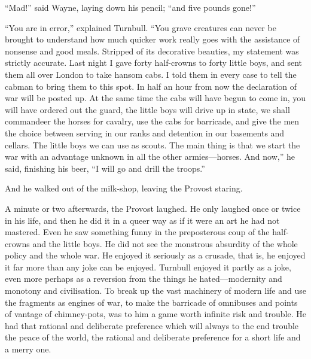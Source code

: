 \documentclass{book}
\begin{document}
“Mad!” said Wayne, laying down his pencil; “and five pounds gone!”

“You are in error,” explained Turnbull. “You grave creatures can never be brought to understand how much quicker work really goes with the assistance of nonsense and good meals. Stripped of its decorative beauties, my statement was strictly accurate. Last night I gave forty half-crowns to forty little boys, and sent them all over London to take hansom cabs. I told them in every case to tell the cabman to bring them to this spot. In half an hour from now the declaration of war will be posted up. At the same time the cabs will have begun to come in, you will have ordered out the guard, the little boys will drive up in state, we shall commandeer the horses for cavalry, use the cabs for barricade, and give the men the choice between serving in our ranks and detention in our basements and cellars. The little boys we can use as scouts. The main thing is that we start the war with an advantage unknown in all the other armies—horses. And now,” he said, finishing his beer, “I will go and drill the troops.”

And he walked out of the milk-shop, leaving the Provost staring.

A minute or two afterwards, the Provost laughed. He only laughed once or twice in his life, and then he did it in a queer way as if it were an art he had not mastered. Even he saw something funny in the preposterous coup of the half-crowns and the little boys. He did not see the monstrous absurdity of the whole policy and the whole war. He enjoyed it seriously as a crusade, that is, he enjoyed it far more than any joke can be enjoyed. Turnbull enjoyed it partly as a joke, even more perhaps as a reversion from the things he hated—modernity and monotony and civilisation. To break up the vast machinery of modern life and use the fragments as engines of war, to make the barricade of omnibuses and points of vantage of chimney-pots, was to him a game worth infinite risk and trouble. He had that rational and deliberate preference which will always to the end trouble the peace of the world, the rational and deliberate preference for a short life and a merry one.
\end{document}
